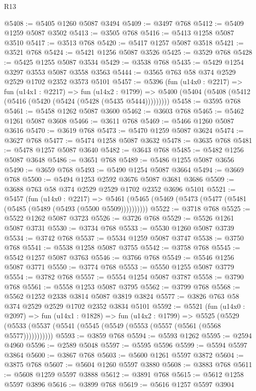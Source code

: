 \begin{lexlean}{R13}
\begin{coremodule}
@5408 := @5405 @1260 @5087 @3494
@5409 := @3497 @768
@5412 := @5409 @1259 @5087 @3502
@5413 := @3505 @768
@5416 := @5413 @1258 @5087 @3510
@5417 := @3513 @768
@5420 := @5417 @1257 @5087 @3518
@5421 := @3521 @768
@5424 := @5421 @1256 @5087 @3526
@5425 := @3529 @768
@5428 := @5425 @1255 @5087 @3534
@5429 := @3538 @768
@5435 := @5429 @1254 @3297 @3553 @5087 @3558 @3563
@5444 := @3565 @763 @58 @374 @2529 @2529 @1702 @2352 @3573 @5101
@5457 := @5396
    (fun (u14x0 : @2217) =>
    fun (u14x1 : @2217) =>
    fun (u14x2 : @1799) =>
    @5400 (@5404 (@5408 (@5412 (@5416 (@5420 (@5424 (@5428 (@5435 @5444)))))))))
@5458 := @3595 @768
@5461 := @5458 @1262 @5087 @3600
@5462 := @3603 @768
@5465 := @5462 @1261 @5087 @3608
@5466 := @3611 @768
@5469 := @5466 @1260 @5087 @3616
@5470 := @3619 @768
@5473 := @5470 @1259 @5087 @3624
@5474 := @3627 @768
@5477 := @5474 @1258 @5087 @3632
@5478 := @3635 @768
@5481 := @5478 @1257 @5087 @3640
@5482 := @3643 @768
@5485 := @5482 @1256 @5087 @3648
@5486 := @3651 @768
@5489 := @5486 @1255 @5087 @3656
@5490 := @3659 @768
@5493 := @5490 @1254 @5087 @3664
@5494 := @3669 @768
@5500 := @5494 @1253 @2592 @3676 @5087 @3681 @3686
@5509 := @3688 @763 @58 @374 @2529 @2529 @1702 @2352 @3696 @5101
@5521 := @5457
    (fun (u14x0 : @2217) =>
    @5461 (@5465 (@5469 (@5473 (@5477 (@5481 (@5485 (@5489 (@5493 (@5500 @5509))))))))))
@5522 := @3718 @768
@5525 := @5522 @1262 @5087 @3723
@5526 := @3726 @768
@5529 := @5526 @1261 @5087 @3731
@5530 := @3734 @768
@5533 := @5530 @1260 @5087 @3739
@5534 := @3742 @768
@5537 := @5534 @1259 @5087 @3747
@5538 := @3750 @768
@5541 := @5538 @1258 @5087 @3755
@5542 := @3758 @768
@5545 := @5542 @1257 @5087 @3763
@5546 := @3766 @768
@5549 := @5546 @1256 @5087 @3771
@5550 := @3774 @768
@5553 := @5550 @1255 @5087 @3779
@5554 := @3782 @768
@5557 := @5554 @1254 @5087 @3787
@5558 := @3790 @768
@5561 := @5558 @1253 @5087 @3795
@5562 := @3799 @768
@5568 := @5562 @1252 @2338 @3814 @5087 @3819 @3824
@5577 := @3826 @763 @58 @374 @2529 @2529 @1702 @2352 @3834 @5101
@5592 := @5521
    (fun (u14x0 : @2097) =>
    fun (u14x1 : @1828) =>
    fun (u14x2 : @1799) =>
    @5525 (@5529 (@5533 (@5537 (@5541 (@5545 (@5549 (@5553 (@5557 (@5561 (@5568 @5577)))))))))))
@5593 := @3859 @768
@5594 := @5593 @1262
@5595 := @2594 @4960
@5596 := @2589 @5048
@5597 := @5595 @5596
@5599 := @5594 @5597 @3864
@5600 := @3867 @768
@5603 := @5600 @1261 @5597 @3872
@5604 := @3875 @768
@5607 := @5604 @1260 @5597 @3880
@5608 := @3883 @768
@5611 := @5608 @1259 @5597 @3888
@5612 := @3891 @768
@5615 := @5612 @1258 @5597 @3896
@5616 := @3899 @768
@5619 := @5616 @1257 @5597 @3904

\end{coremodule}
\end{lexlean}
